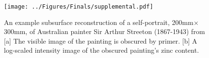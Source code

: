 \documentclass[%
  aip,12pt,tightenlines,
  amsthm,
 amsmath,amssymb
]{article}
\newcommand{\fLabel}[1]{\label{figure:#1}}
\newcommand{\pcaption}[1]{\caption{\noindent#1}}
\newcommand{\pEndF}[0]{ \\ }
\newcommand{\pStartF}[0]{ }
\begin{document}
\begin{figure}
\centering
\texttt{[image: ../Figures/Finals/supplemental.pdf]}%
\pcaption{\noindent\fLabel{Cartoon}\pStartF An example subsurface reconstruction of a self-portrait, 200mm$\times$300mm, of Australian painter Sir Arthur Streeton (1867-1943) from \citet{howard_high-definition_2012} [a] The visible image of the painting is obscured by primer. [b] A log-scaled intensity image of the obscured painting's zinc content. \pEndF }
\end{figure}
\end{document}
